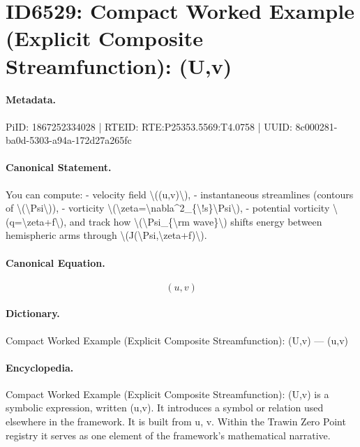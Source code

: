 \section*{ID6529: Compact Worked Example (Explicit Composite Streamfunction): (U,v)}
\paragraph{Metadata.}
PiID: 1867252334028 | RTEID: RTE:P25353.5569:T4.0758 | UUID: 8c000281-ba0d-5303-a94a-172d27a265fc

\paragraph{Canonical Statement.}
You can compute: - velocity field \textbackslash{}((u,v)\textbackslash{}), - instantaneous streamlines (contours of \textbackslash{}(\textbackslash{}Psi\textbackslash{})), - vorticity \textbackslash{}(\textbackslash{}zeta=\textbackslash{}nabla\textasciicircum{}2\_\{\textbackslash{}!s\}\textbackslash{}Psi\textbackslash{}), - potential vorticity \textbackslash{}(q=\textbackslash{}zeta+f\textbackslash{}), and track how \textbackslash{}(\textbackslash{}Psi\_\{\textbackslash{}rm wave\}\textbackslash{}) shifts energy between hemispheric arms through \textbackslash{}(J(\textbackslash{}Psi,\textbackslash{}zeta+f)\textbackslash{}).

\paragraph{Canonical Equation.}
\[
(u,v)
\]

\paragraph{Dictionary.}
Compact Worked Example (Explicit Composite Streamfunction): (U,v) — (u,v)

\paragraph{Encyclopedia.}
Compact Worked Example (Explicit Composite Streamfunction): (U,v) is a symbolic expression, written (u,v). It introduces a symbol or relation used elsewhere in the framework. It is built from u, v. Within the Trawin Zero Point registry it serves as one element of the framework's mathematical narrative.
